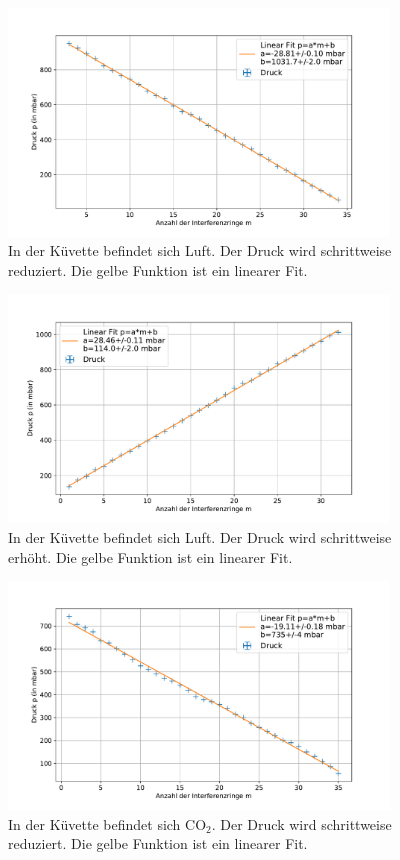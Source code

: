 \documentclass[
	a4paper,
	12pt,
	pagesize,
	ngerman
]{scrartcl}
\begin{document}
\begin{figure}[H]
		\includegraphics[width=0.9\textwidth]{images/Luft_Raus.pdf}
		\centering
		\caption{In der Küvette befindet sich Luft. Der Druck wird schrittweise reduziert. Die gelbe Funktion ist ein linearer Fit.}
		\label{fig_luft_raus}
	\end{figure}
\begin{figure}[H]
		\includegraphics[width=0.9\textwidth]{images/Luft_Rein.pdf}
		\centering
		\caption{In der Küvette befindet sich Luft. Der Druck wird schrittweise erhöht. Die gelbe Funktion ist ein linearer Fit.}
		\label{fig_luft_rein}
	\end{figure}
\begin{figure}[H]
		\includegraphics[width=0.9\textwidth]{images/CO2_Raus.pdf}
		\centering
		\caption{In der Küvette befindet sich CO$_2$. Der Druck wird schrittweise reduziert. Die gelbe Funktion ist ein linearer Fit.}
		\label{fig_co2_raus}
	\end{figure}
\end{document}
